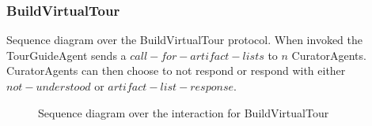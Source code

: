 \documentclass[paper=letter, fontsize=12pt]{article}
\begin{document}
\subsubsection{BuildVirtualTour}
Sequence diagram over the BuildVirtualTour protocol. When invoked the TourGuideAgent sends a $call-for-artifact-lists$ to $n$ CuratorAgents. CuratorAgents can then choose to not respond or respond with either $not-understood$ or $artifact-list-response$.
\begin{figure}[H]
  \begin{center}
    \caption{Sequence diagram over the interaction for BuildVirtualTour}
    \label{fig:build_virtual_tour_sequence}
  \end{center}
\end{figure}
\end{document}
